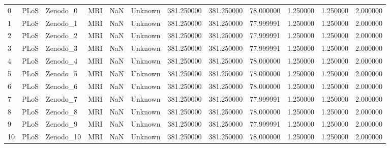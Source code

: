 \begin{tabular}{llllrlrrrrrr}
0      &            PLoS &     Zenodo\_0 &                MRI &        NaN &  Unknown &       381.250000 &    381.250000 &   78.000000 &               1.250000 &            1.250000 &          2.000000 \\
1      &            PLoS &     Zenodo\_1 &                MRI &        NaN &  Unknown &       381.250000 &    381.250000 &   77.999991 &               1.250000 &            1.250000 &          2.000000 \\
2      &            PLoS &     Zenodo\_2 &                MRI &        NaN &  Unknown &       381.250000 &    381.250000 &   77.999991 &               1.250000 &            1.250000 &          2.000000 \\
3      &            PLoS &     Zenodo\_3 &                MRI &        NaN &  Unknown &       381.250000 &    381.250000 &   77.999991 &               1.250000 &            1.250000 &          2.000000 \\
4      &            PLoS &     Zenodo\_4 &                MRI &        NaN &  Unknown &       381.250000 &    381.250000 &   78.000000 &               1.250000 &            1.250000 &          2.000000 \\
5      &            PLoS &     Zenodo\_5 &                MRI &        NaN &  Unknown &       381.250000 &    381.250000 &   78.000000 &               1.250000 &            1.250000 &          2.000000 \\
6      &            PLoS &     Zenodo\_6 &                MRI &        NaN &  Unknown &       381.250000 &    381.250000 &   78.000000 &               1.250000 &            1.250000 &          2.000000 \\
7      &            PLoS &     Zenodo\_7 &                MRI &        NaN &  Unknown &       381.250000 &    381.250000 &   77.999991 &               1.250000 &            1.250000 &          2.000000 \\
8      &            PLoS &     Zenodo\_8 &                MRI &        NaN &  Unknown &       381.250000 &    381.250000 &   78.000000 &               1.250000 &            1.250000 &          2.000000 \\
9      &            PLoS &     Zenodo\_9 &                MRI &        NaN &  Unknown &       381.250000 &    381.250000 &   77.999991 &               1.250000 &            1.250000 &          2.000000 \\
10     &            PLoS &    Zenodo\_10 &                MRI &        NaN &  Unknown &       381.250000 &    381.250000 &   78.000000 &               1.250000 &            1.250000 &          2.000000 \\

\end{tabular}

